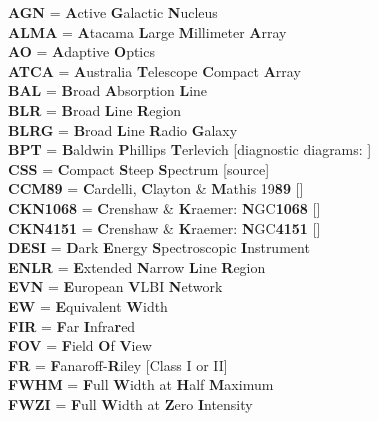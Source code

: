 \vspace*{-24pt}
\normalsize{

\textbf{AGN} = \textbf{A}ctive \textbf{G}alactic \textbf{N}ucleus \\
\textbf{ALMA} = \textbf{A}tacama \textbf{L}arge \textbf{M}illimeter \textbf{A}rray \\
\textbf{AO} = \textbf{A}daptive \textbf{O}ptics \\
\textbf{ATCA} = \textbf{A}ustralia \textbf{T}elescope \textbf{C}ompact \textbf{A}rray \\
\textbf{BAL} = \textbf{B}road \textbf{A}bsorption \textbf{L}ine \\
\textbf{BLR} = \textbf{B}road \textbf{L}ine \textbf{R}egion \\
\textbf{BLRG} = \textbf{B}road \textbf{L}ine \textbf{R}adio \textbf{G}alaxy \\
\textbf{BPT} = \textbf{B}aldwin \textbf{P}hillips \textbf{T}erlevich [diagnostic diagrams: \citealt{Baldwin1981}] \\
\textbf{CSS} = \textbf{C}ompact \textbf{S}teep \textbf{S}pectrum [source] \\
\textbf{CCM89} = \textbf{C}ardelli, \textbf{C}layton \& \textbf{M}athis 19\textbf{89} [\citealt{Cardelli1989}] \\
\textbf{CKN1068} = \textbf{C}renshaw \& \textbf{K}raemer: \textbf{N}GC\;\textbf{1068} [\citealt{Crenshaw2000_N1068}] \\
\textbf{CKN4151} = \textbf{C}renshaw \& \textbf{K}raemer: \textbf{N}GC\;\textbf{4151} [\citealt{Crenshaw2000_N4151}] \\
\textbf{DESI} = \textbf{D}ark \textbf{E}nergy \textbf{S}pectroscopic \textbf{I}nstrument \\
\textbf{ENLR} = \textbf{E}xtended \textbf{N}arrow \textbf{L}ine \textbf{R}egion \\
\textbf{EVN}  = \textbf{E}uropean \textbf{V}LBI \textbf{N}etwork \\
\textbf{EW} = \textbf{E}quivalent \textbf{W}idth \\
\textbf{FIR} = \textbf{F}ar \textbf{I}nfra\textbf{r}ed \\
\textbf{FOV} = \textbf{F}ield \textbf{O}f \textbf{V}iew \\
\textbf{FR} = \textbf{F}anaroff-\textbf{R}iley [Class I or II] \\
\textbf{FWHM} = \textbf{F}ull \textbf{W}idth at \textbf{H}alf \textbf{M}aximum \\
\textbf{FWZI} = \textbf{F}ull \textbf{W}idth at \textbf{Z}ero \textbf{I}ntensity \\
}
